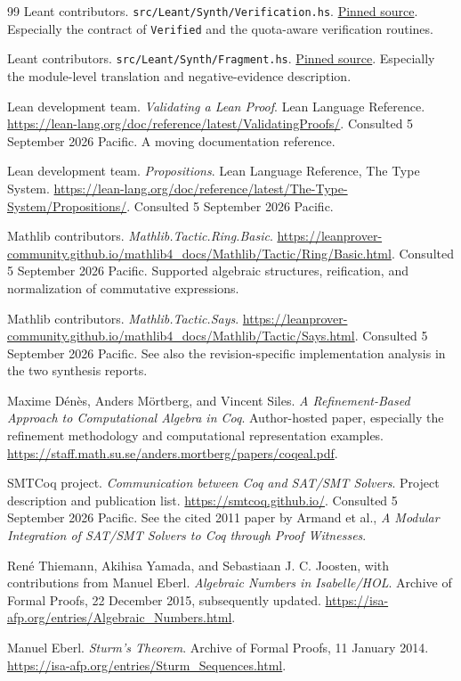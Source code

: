 \documentclass[11pt,a4paper]{article}
\newcommand{\code}[1]{\nolinkurl{#1}}
\newcommand{\src}[2]{\href{#1}{#2}}
\theoremstyle{definition}
\begin{document}
\begin{thebibliography}{99}
Leant contributors. \code{src/Leant/Synth/Verification.hs}.
\src{https://github.com/VladimirReshetnikov/Leant/blob/3a40904be8a410d832d9ab6900b3d3e7b425eccb/src/Leant/Synth/Verification.hs}{Pinned source}.
Especially the contract of \code{Verified} and the quota-aware verification routines.

Leant contributors. \code{src/Leant/Synth/Fragment.hs}.
\src{https://github.com/VladimirReshetnikov/Leant/blob/3a40904be8a410d832d9ab6900b3d3e7b425eccb/src/Leant/Synth/Fragment.hs}{Pinned source}.
Especially the module-level translation and negative-evidence description.

Lean development team. \emph{Validating a Lean Proof}.
Lean Language Reference.
\url{https://lean-lang.org/doc/reference/latest/ValidatingProofs/}.
Consulted 5 September 2026 Pacific. A moving documentation reference.

Lean development team. \emph{Propositions}.
Lean Language Reference, The Type System.
\url{https://lean-lang.org/doc/reference/latest/The-Type-System/Propositions/}.
Consulted 5 September 2026 Pacific.

Mathlib contributors. \emph{Mathlib.Tactic.Ring.Basic}.
\url{https://leanprover-community.github.io/mathlib4_docs/Mathlib/Tactic/Ring/Basic.html}.
Consulted 5 September 2026 Pacific. Supported algebraic structures, reification,
and normalization of commutative expressions.

Mathlib contributors. \emph{Mathlib.Tactic.Says}.
\url{https://leanprover-community.github.io/mathlib4_docs/Mathlib/Tactic/Says.html}.
Consulted 5 September 2026 Pacific. See also the revision-specific implementation
analysis in the two synthesis reports.

Maxime D\'en\`es, Anders M\"ortberg, and Vincent Siles.
\emph{A Refinement-Based Approach to Computational Algebra in Coq}.
Author-hosted paper, especially the refinement methodology and computational
representation examples.
\url{https://staff.math.su.se/anders.mortberg/papers/coqeal.pdf}.

SMTCoq project. \emph{Communication between Coq and SAT/SMT Solvers}.
Project description and publication list.
\url{https://smtcoq.github.io/}.
Consulted 5 September 2026 Pacific. See the cited 2011 paper by Armand et al.,
\emph{A Modular Integration of SAT/SMT Solvers to Coq through Proof Witnesses}.

Ren\'e Thiemann, Akihisa Yamada, and Sebastiaan J. C. Joosten,
with contributions from Manuel Eberl.
\emph{Algebraic Numbers in Isabelle/HOL}.
Archive of Formal Proofs, 22 December 2015, subsequently updated.
\url{https://isa-afp.org/entries/Algebraic_Numbers.html}.

Manuel Eberl. \emph{Sturm's Theorem}.
Archive of Formal Proofs, 11 January 2014.
\url{https://isa-afp.org/entries/Sturm_Sequences.html}.

\end{thebibliography}
\end{document}
